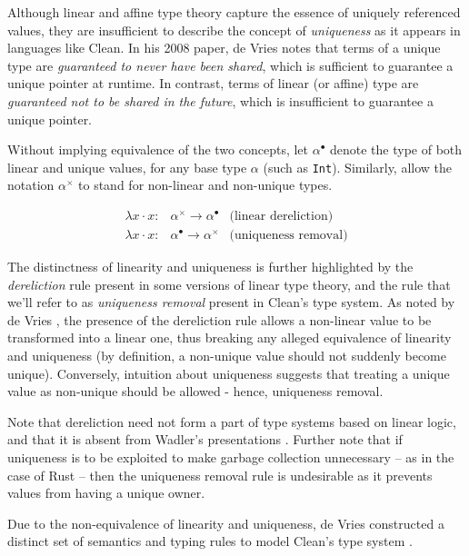 \documentclass[]{unswthesis}
\begin{document}
Although linear and affine type theory capture the essence of uniquely referenced values, they are insufficient to describe the concept of \textit{uniqueness} as it appears in languages like Clean. In his 2008 paper, de Vries \cite{deVries08} notes that terms of a unique type are \textit{guaranteed to never have been shared}, which is sufficient to guarantee a unique pointer at runtime. In contrast, terms of linear (or affine) type are \textit{guaranteed not to be shared in the future}, which is insufficient to guarantee a unique pointer.

Without implying equivalence of the two concepts, let $\alpha^\bullet$ denote the type of both linear and unique values, for any base type $\alpha$ (such as \texttt{Int}). Similarly, allow the notation $\alpha^\times$ to stand for non-linear and non-unique types.

\begin{eqnarray*}
\lambda x \cdot x : & \alpha^\times \rightarrow \alpha^\bullet & \text{(linear dereliction)}\\
\lambda x \cdot x : & \alpha^\bullet \rightarrow \alpha^\times & \text{(uniqueness removal)}
\end{eqnarray*}

The distinctness of linearity and uniqueness is further highlighted by the \textit{dereliction} rule present in some versions of linear type theory, and the rule that we'll refer to as \textit{uniqueness removal} present in Clean's type system. As noted by de Vries \cite{deVriesPhD08}, the presence of the dereliction rule allows a non-linear value to be transformed into a linear one, thus breaking any alleged equivalence of linearity and uniqueness (by definition, a non-unique value should not suddenly become unique). Conversely, intuition about uniqueness suggests that treating a unique value as non-unique should be allowed - hence, uniqueness removal.

Note that dereliction need not form a part of type systems based on linear logic, and that it is absent from Wadler's presentations \cite{wadler90, wadler93}. Further note that if uniqueness is to be exploited to make garbage collection unnecessary -- as in the case of Rust -- then the uniqueness removal rule is undesirable as it prevents values from having a unique owner.

Due to the non-equivalence of linearity and uniqueness, de Vries constructed a distinct set of semantics and typing rules to model Clean's type system \cite{deVries08}.
\end{document}
